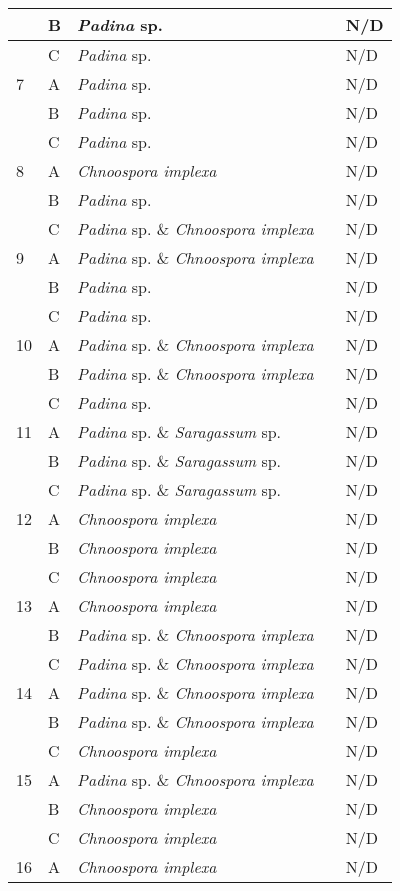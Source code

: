 \documentclass[12pt]{article}
\begin{document}
\begin{longtable}{ | p{1cm} | p{1cm} | p{3cm} | p{4cm} | p{4cm} | }
\hline
&B&\emph{Padina} sp.&&N/D\\
\hline
&C&\emph{Padina} sp.&&N/D\\
\hline
7&A&\emph{Padina} sp.&&N/D\\
\hline
&B&\emph{Padina} sp.&&N/D\\
\hline
&C&\emph{Padina} sp.&&N/D\\
\hline
8&A&\emph{Chnoospora implexa}&&N/D\\
\hline
&B&\emph{Padina} sp.&&N/D\\
\hline
&C&\emph{Padina} sp. \& \emph{Chnoospora implexa}&&N/D\\
\hline
9&A&\emph{Padina} sp. \& \emph{Chnoospora implexa}&&N/D\\
\hline
&B&\emph{Padina} sp.&&N/D\\
\hline
&C&\emph{Padina} sp.&&N/D\\
\hline
10&A&\emph{Padina} sp. \& \emph{Chnoospora implexa}&&N/D\\
\hline
&B&\emph{Padina} sp. \& \emph{Chnoospora implexa}&&N/D\\
\hline
&C&\emph{Padina} sp.&&N/D\\
\hline
11&A&\emph{Padina} sp. \& \emph{Saragassum} sp.&&N/D\\
\hline
&B&\emph{Padina} sp. \& \emph{Saragassum} sp.&&N/D\\
\hline
&C&\emph{Padina} sp. \& \emph{Saragassum} sp.&&N/D\\
\hline
12&A&\emph{Chnoospora implexa}&&N/D\\
\hline
&B&\emph{Chnoospora implexa}&&N/D\\
\hline
&C&\emph{Chnoospora implexa}&&N/D\\
\hline
13&A&\emph{Chnoospora implexa}&&N/D\\
\hline
&B&\emph{Padina} sp. \& \emph{Chnoospora implexa}&&N/D\\
\hline
&C&\emph{Padina} sp. \& \emph{Chnoospora implexa}&&N/D\\
\hline
14&A&\emph{Padina} sp. \& \emph{Chnoospora implexa}&&N/D\\
\hline
&B&\emph{Padina} sp. \& \emph{Chnoospora implexa}&&N/D\\
\hline
&C&\emph{Chnoospora implexa}&&N/D\\
\hline
15&A&\emph{Padina} sp. \& \emph{Chnoospora implexa}&&N/D\\
\hline
&B&\emph{Chnoospora implexa}&&N/D\\
\hline
&C&\emph{Chnoospora implexa}&&N/D\\
\hline
16&A&\emph{Chnoospora implexa}&&N/D\\

\end{longtable}
\end{document}
